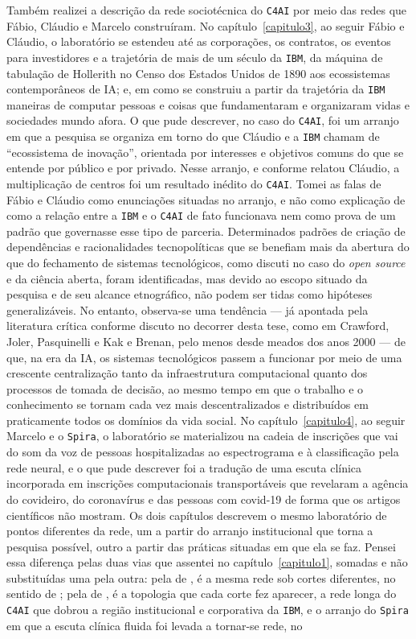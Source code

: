 Também realizei a descrição da rede sociotécnica do \texttt{C4AI} por meio das redes que Fábio, Cláudio e Marcelo construíram. No capítulo~\ref{capitulo3}, ao seguir Fábio e Cláudio, o laboratório se estendeu até as corporações, os contratos, os eventos para investidores e a trajetória de mais de um século da \texttt{IBM}, da máquina de tabulação de Hollerith no Censo dos Estados Unidos de 1890 aos ecossistemas contemporâneos de IA; e, em como se construiu a partir da trajetória da \texttt{IBM} maneiras de computar pessoas e coisas que fundamentaram e organizaram vidas e sociedades mundo afora. O que pude descrever, no caso do \texttt{C4AI}, foi um arranjo em que a pesquisa se organiza em torno do que Cláudio e a \texttt{IBM} chamam de \enquote{ecossistema de inovação}, orientada por interesses e objetivos comuns do que se entende por público e por privado. Nesse arranjo, e conforme relatou Cláudio, a multiplicação de centros foi um resultado inédito do \texttt{C4AI}. Tomei as falas de Fábio e Cláudio como enunciações situadas no arranjo, e não como explicação de como a relação entre a \texttt{IBM} e o \texttt{C4AI} de fato funcionava nem como prova de um padrão que governasse esse tipo de parceria. Determinados padrões de criação de dependências e racionalidades tecnopolíticas que se benefiam mais da abertura do que do fechamento de sistemas tecnológicos, como discuti no caso do \textit{open source} e da ciência aberta, foram identificadas, mas devido ao escopo situado da pesquisa e de seu alcance etnográfico, não podem ser tidas como hipóteses generalizáveis. No entanto, observa-se uma tendência --- já apontada pela literatura crítica conforme discuto no decorrer desta tese, como em Crawford, Joler, Pasquinelli e Kak e Brenan, pelo menos desde meados dos anos 2000 --- de que, na era da IA, os sistemas tecnológicos passem a funcionar por meio de uma crescente centralização tanto da infraestrutura computacional quanto dos processos de tomada de decisão, ao mesmo tempo em que o trabalho e o conhecimento se tornam cada vez mais descentralizados e distribuídos em praticamente todos os domínios da vida social. No capítulo~\ref{capitulo4}, ao seguir Marcelo e o \texttt{Spira}, o laboratório se materializou na cadeia de inscrições que vai do som da voz de pessoas hospitalizadas ao espectrograma e à classificação pela rede neural, e o que pude descrever foi a tradução de uma escuta clínica incorporada em inscrições computacionais transportáveis que revelaram a agência do covideiro, do coronavírus e das pessoas com covid-19 de forma que os artigos científicos não mostram. Os dois capítulos descrevem o mesmo laboratório de pontos diferentes da rede, um a partir do arranjo institucional que torna a pesquisa possível, outro a partir das práticas situadas em que ela se faz. Pensei essa diferença pelas duas vias que assentei no capítulo~\ref{capitulo1}, somadas e não substituídas uma pela outra: pela de \textcite{latour1996clarifications}, é a mesma rede sob cortes diferentes, no sentido de \textcite{strathern2011cortando}; pela de \textcite{MolLaw1994}, é a topologia que cada corte fez aparecer, a rede longa do \texttt{C4AI} que dobrou a região institucional e corporativa da \texttt{IBM}, e o arranjo do \texttt{Spira} em que a escuta clínica fluida foi levada a tornar-se rede, no 